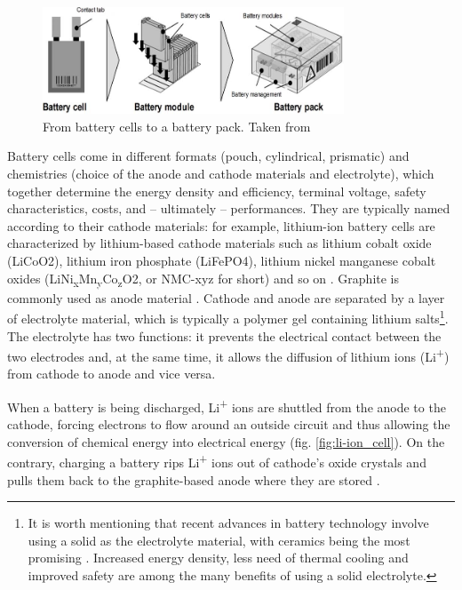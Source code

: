 \begin{figure}[hbt!]
    \centering
    \includegraphics[width=0.8\textwidth]{images/cell2module2battery}
    \caption[From battery cells to a battery pack]{From battery cells to a battery pack. Taken from \cite{cell2module2battery}}
    \label{fig:cell2module2battery}
\end{figure}

Battery cells come in different formats (pouch, cylindrical, prismatic) and chemistries (choice of the anode and cathode materials and electrolyte), which together determine the energy density and efficiency, terminal voltage, safety characteristics, costs, and -- ultimately -- performances. They are typically named according to their cathode materials: for example, lithium-ion battery cells are characterized by lithium-based cathode materials such as lithium cobalt oxide (LiCoO2), lithium iron phosphate (LiFePO4), lithium nickel manganese cobalt oxides (LiNi\textsubscript{x}Mn\textsubscript{y}Co\textsubscript{z}O2, or NMC-xyz for short) and so on \cite{li-ion_chemistries}. Graphite is commonly used as anode material \cite{anode_material}. Cathode and anode are separated by a layer of electrolyte material, which is typically a polymer gel containing lithium salts\footnote{It is worth mentioning that recent advances in battery technology involve using a solid as the electrolyte material, with ceramics being the most promising \cite{solid_electrolyte}. Increased energy density, less need of thermal cooling and improved safety are among the many benefits of using a solid electrolyte.}. The electrolyte has two functions: it prevents the electrical contact between the two electrodes and, at the same time, it allows the diffusion of lithium ions (Li\textsuperscript{+}) from cathode to anode and vice versa.

When a battery is being discharged, Li\textsuperscript{+} ions are shuttled from
the anode to the cathode, forcing electrons to flow around an outside circuit and thus allowing the conversion of chemical energy
into electrical energy (fig. \ref{fig:li-ion_cell}). On the contrary, charging a battery rips Li\textsuperscript{+} ions out of cathode's oxide crystals and pulls them back to the graphite-based anode where they are stored \cite{nature_li-ion}.

